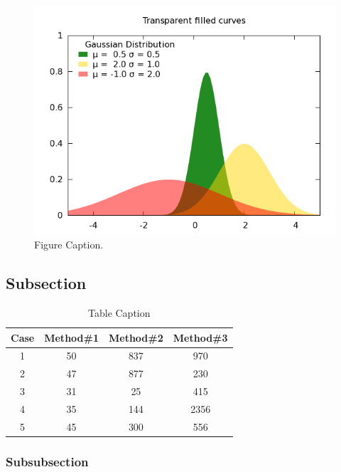 \begin{figure}[h]
 \begin{center}
 \includegraphics [width=12cm]{Figures/Background/pic.png}
 \caption{Figure Caption.}
 \label{fig:label}
\end{center}
\end{figure} 

\cite{gum, ghc-smp}

\subsection{Subsection}

\begin{table}[h]
\begin{center}
\begin{tabular}{c c c c} %
\hline\hline %
Case & Method\#1 & Method\#2 & Method\#3 \\ [0.5ex] %
\hline %
1 & 50 & 837 & 970 \\ %
2 & 47 & 877 & 230 \\
3 & 31 & 25 & 415 \\
4 & 35 & 144 & 2356 \\
5 & 45 & 300 & 556 \\ [1ex] %
\hline %
\end{tabular}\caption{Table Caption}
\label{tab:lable}
\end{center}
\end{table}


\subsubsection{Subsubsection}